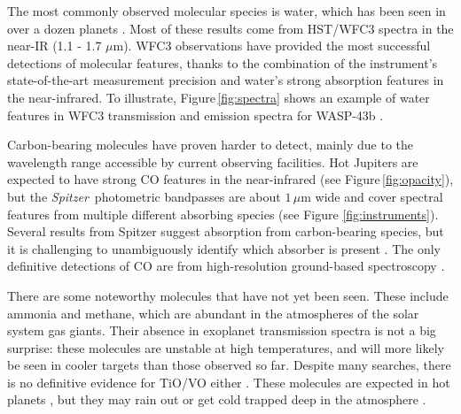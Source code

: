 \documentclass[graybox,natbib,nosecnum]{svmult}
\newcommand{\project}[1]{\textsl{#1}}
\newcommand{\Spitzer}{\project{Spitzer}}
\begin{document}
The most commonly observed molecular species is water, which has been seen in over a dozen planets \citep[e.g.][]{deming13, huitson13, birkby13, mccullough14, fraine14, kreidberg14b, kreidberg15b, line16, evans16, stevenson16b}. Most of these results come from HST/WFC3 spectra in the near-IR (1.1 - 1.7 $\mu$m). WFC3 observations have provided the most successful detections of molecular features, thanks to the combination of the instrument's state-of-the-art measurement precision and water's strong absorption features in the near-infrared.  To illustrate, Figure\,\ref{fig:spectra} shows an example of water features in WFC3 transmission and emission spectra for WASP-43b \citep{kreidberg14b}.  


Carbon-bearing molecules have proven harder to detect, mainly due to the wavelength range accessible by current observing facilities. Hot Jupiters are expected to have strong CO features in the near-infrared (see Figure\,\ref{fig:opacity}), but the \Spitzer\ photometric bandpasses are about $1\,\mu$m wide and cover spectral features from multiple different absorbing species (see Figure \ref{fig:instruments}). Several results from Spitzer suggest absorption from carbon-bearing species, but it is challenging to unambiguously identify which absorber is present \citep[e.g.][]{desert09, stevenson10, madhusudhan11, morley17}.  The only definitive detections of CO are from high-resolution ground-based spectroscopy \citep{dekok13,brogi14}.  

There are some noteworthy molecules that have not yet been seen. These include ammonia and methane, which are abundant in the atmospheres of the solar system gas giants. Their absence in exoplanet transmission spectra is not a big surprise: these molecules are unstable at high temperatures, and will more likely be seen in cooler targets than those observed so far.  Despite many searches, there is no definitive evidence for TiO/VO either \citep[e.g.,][]{sing13, evans16}. These molecules are expected in hot planets \citep{fortney08}, but they may rain out or get cold trapped deep in the atmosphere \citep{parmentier13}.
\end{document}
